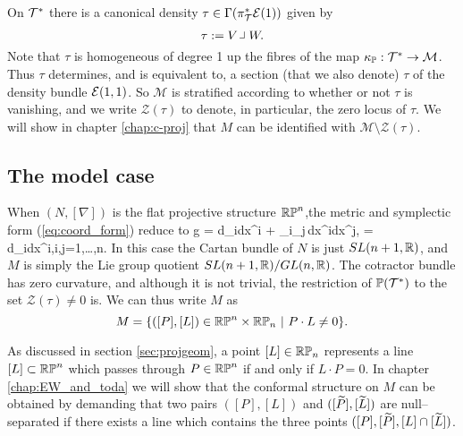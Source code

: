 On $\mathcal{T}^*$ there is  a canonical density $\tau\in \Gamma(\pi_{\mathcal{T}}^*\mathcal{E}(1))$ given by
$$
\tau:= V\hook W .
$$
Note that $\tau$ is homogeneous of degree 1 up the fibres of the
map $\kappa_{\mathbb{P}}:\mathcal{T}^*\to \mathcal{M}$. Thus $\tau$ determines, and is equivalent
to, a section (that we also denote) $\tau$ of the density bundle $\mathcal{E}(1,1)$. So $\mathcal{M}$ is stratified according to
whether or not $\tau$ is vanishing, and we write $\mathcal{Z}(\tau)$
to denote, in particular, the zero locus of $\tau$. We will show in chapter \ref{chap:c-proj} that $M$ can be identified with $\mathcal{M}\setminus \mathcal{Z}(\tau)$.



\subsection{The model case} \label{sec:intro_model}
When $(N,[\nabla])$ is the flat projective structure $\mathbb{RP}^n$,the metric and symplectic form (\ref{eq:coord_form}) reduce to
\be \label{eq:intro_model_g}
g = d\zeta_i\odot dx^i + \zeta_i\zeta_j\,dx^i\odot dx^j, \quad \Omega = d\zeta_i\wedge dx^i,\quad i,j=1,\dots,n.
\ee
In this case the Cartan bundle of $N$ is just $SL(n+1,\mathbb{R})$, and $M$ is simply the Lie group quotient $SL(n+1,\mathbb{R})/GL(n,\mathbb{R})$. The cotractor bundle has zero curvature, and although it is not trivial, the restriction of $\mathbb{P}(\mathcal{T}^*)$ to the set $\mathcal{Z}(\tau)\neq 0$ is. %
We can thus write $M$ as
\[
M=\{([P],[L])\in\RP^n\times\RP_n\ |\ P\cdot L\neq 0\}.
\]

As discussed in section \ref{sec:projgeom}, a point $[L]\in\mathbb{RP}_n$ represents a line $[L]\subset\mathbb{RP}^n$ which passes through $P\in\mathbb{RP}^n$ if and only if $L\cdot P=0$. In chapter \ref{chap:EW_and_toda} we will show that the conformal structure on $M$ can be obtained by demanding that two pairs $([P], [L])$ and $([\widetilde{P}], [\widetilde{L}])$ are null--separated if there exists a line which contains the three points $([P], [\widetilde{P}], [L]\cap [\widetilde{L}])$.

